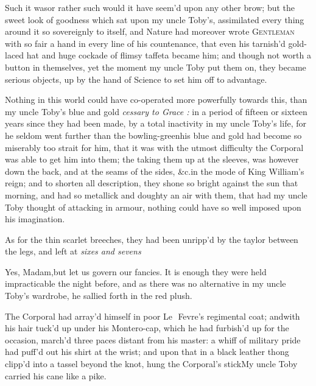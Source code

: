 \documentclass{article}
\begin{document}
Such it was\tsh or rather such would it have
seem’d upon any other brow; but the sweet look of goodness
which sat upon my uncle Toby’s, assimilated every
thing around it so sovereignly to itself, and Nature had moreover
wrote \textsc{Gentleman} with so fair a hand in every line of
his countenance, that even his tarnish’d gold-laced hat and
huge cockade of flimsy taffeta became him; and though not worth a
button in themselves, yet the moment my uncle Toby put them
on, they became serious objects,\pb 
{} 
up by the hand of Science to set him off to
advantage.

\enlargethispage\baselineskip

Nothing in this world could have co-operated more powerfully
towards this, than my uncle Toby’s blue and
gold\tsh\break 
{} 
\textit{cessary to Grace :} in a period of fifteen or sixteen years
since they had been made, by a total inactivity in my uncle
Toby’s life, for he seldom went further than the
bowling-green\tsk his blue and gold had become so miserably too
strait for him, that it was with the utmost difficulty the Corporal
was able to get him into them; the taking them up at the sleeves,
was\break
{} however down the
back, and at the seams of the sides, \&c.\@ in the mode of King\pb
William’s reign; and to shorten all description, they
shone so bright against the sun that morning, and had so metallick
and doughty an air with them, that had my uncle Toby thought
of attacking in armour, nothing could have so well imposed upon his
imagination.

As for the thin scarlet breeches, they had been unripp’d
by the taylor between the legs, and left at \textit{sixes and
sevens}\tsh

\tsh Yes, Madam,\tsh but let us govern our
fancies. It is enough they were held impracticable the night
before, and as there was no alternative in my uncle
Toby’s wardrobe, he sallied forth in the red
plush.

The Corporal had array’d himself in poor \hbox{Le\, Fevre’s} regimental coat; and\pb with his
hair tuck’d up under his Mon\-tero-cap, which he had furbish’d up for the occasion,
march’d three paces distant from his master: a whiff of military pride had puff’d
out his shirt at the wrist; and upon that in a black leather thong clipp’d into a
tassel beyond the knot, hung the Corporal’s stick\tsh\break My uncle Toby carried
his cane like a pike.
\end{document}
